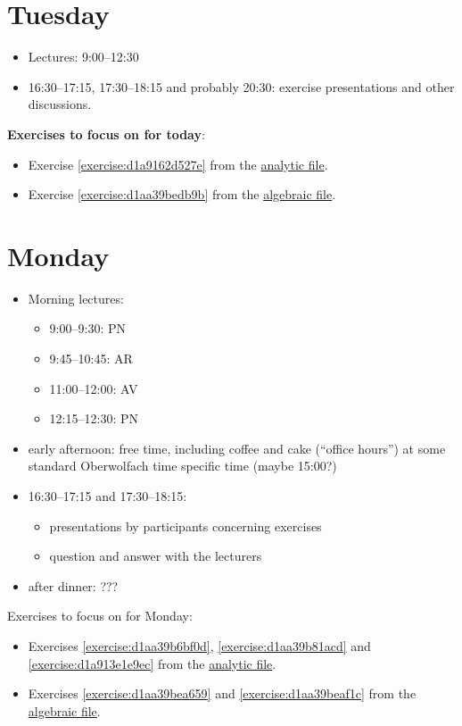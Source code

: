 \documentclass[reqno]{amsart} 
\begin{document}
\section{Tuesday}
\begin{itemize}
\item Lectures: 9:00--12:30
\item 16:30--17:15, 17:30--18:15 and probably 20:30: exercise presentations and other discussions.
\end{itemize}
\textbf{Exercises to focus on for today}:
\begin{itemize}
\item Exercise \ref{exercise:d1a9162d527e} from the \href{20230524T094424__exercises-localized-vectors.pdf}{analytic file}.
\item Exercise \ref{exercise:d1aa39bedb9b} from the \href{20230528T213149__microlocal-algebraic-exercises.pdf}{algebraic file}.
\end{itemize}

\section{Monday}
\begin{itemize}
\item Morning lectures:
  \begin{itemize}
  \item 9:00--9:30: PN
  \item 9:45--10:45: AR
  \item 11:00--12:00: AV
  \item 12:15--12:30: PN
  \end{itemize}
\item early afternoon: free time, including coffee and cake (``office hours'') at some standard Oberwolfach time specific time (maybe 15:00?)
\item 16:30--17:15 and 17:30--18:15:
  \begin{itemize}
  \item presentations by participants concerning exercises
  \item question and answer with the lecturers
  \end{itemize}
\item after dinner: ???
\end{itemize}

Exercises to focus on for Monday:
\begin{itemize}
\item Exercises \ref{exercise:d1aa39b6bf0d}, \ref{exercise:d1aa39b81acd} and \ref{exercise:d1a913e1e9ec} from the \href{20230524T094424__exercises-localized-vectors.pdf}{analytic file}.
\item Exercises \ref{exercise:d1aa39bea659} and \ref{exercise:d1aa39beaf1c} from the \href{20230528T213149__microlocal-algebraic-exercises.pdf}{algebraic file}.
\end{itemize}

{} 
\end{document}

